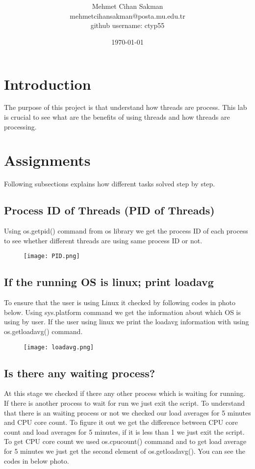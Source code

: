 \documentclass[onecolumn]{article}
\title{\spacecaps{Assignment Report 1: Process and Thread Implementation}\\ \normalsize \spacesc{CENG2034, Operating Systems} }
\author{Mehmet Cihan Sakman\\mehmetcihansakman@posta.mu.edu.tr\\github username: ctyp55}
\date{\today}
\begin{document}
\maketitle

\section{Introduction}
The purpose of this project is that understand how threads are process. This lab is crucial to see what are the benefits of using threads and how threads are processing.

\section{Assignments}
Following subsections explains how different tasks solved step by step.

\subsection{Process ID of Threads (PID of Threads)}

Using os.getpid() command from os library we get the process ID of each process to see whether different threads are using same process ID or not.

\begin{figure}[h]
\texttt{[image: PID.png]}
\centering
\end{figure}

\subsection{If the running OS is linux; print loadavg}
To ensure that the user is using Linux it checked by following codes in photo below. Using sys.platform command we get the information about which OS is using by user. If the user using linux we print the loadavg information with using os.getloadavg() command.

\begin{figure}[h]
\texttt{[image: loadavg.png]}
\centering
\end{figure}

\subsection{Is there any waiting process?}
At this stage we checked if there any other process which is waiting for running. If there is another process to wait for run we just exit the script. To understand that there is an waiting process or not we checked our load averages for 5 minutes and CPU core count. To figure it out we get the difference between CPU core count and load averages for 5 minutes, if it is less than 1 we just exit the script. To get CPU core count we used os.cpucount() command and to get load average for 5 minutes we just get the second element of os.getloadavg(). You can see the codes in below photo.
\end{document}
